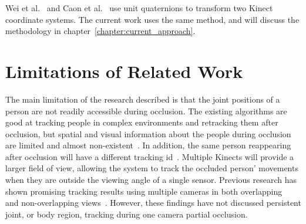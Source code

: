 Wei et al.~\cite{wei_kinect_calibration} and Caon et al.~\cite{caon_context_aware_gesture} use unit quaternions to transform two Kinect coordinate systems. The current work uses the same method, and will discuss the methodology in chapter~\ref{chapter:current_approach}.

\section{Limitations of Related Work}

The main limitation of the research described is that the joint positions of a person are not readily accessible during occlusion. The existing algorithms are good at tracking people in complex environments and retracking them after occlusion, but spatial and visual information about the people during occlusion are limited and almost non-existent~\cite{munaro_tracking_within_groups_with_mobile_robot}. In addition, the same person reappearing after occlusion will have a different tracking id~\cite{liu_tracking_with_pei}. Multiple Kinects will provide a larger field of view, allowing the system to track the occluded person' movements when they are outside the viewing angle of a single sensor. Previous research has shown promising tracking results using multiple cameras in both overlapping ~\cite{zhang_multiple_depth_cameras, chu_multiple_cameras_transfer_functions, yildiz_multiple_cameras_constraints, yamashita_multiple_cameras_face_detection} and non-overlapping views~\cite{cai_intercamera_context_tracking, javed_tracking_disjoint}. However, these findings have not discussed persistent joint, or body region, tracking during one camera partial occlusion.



